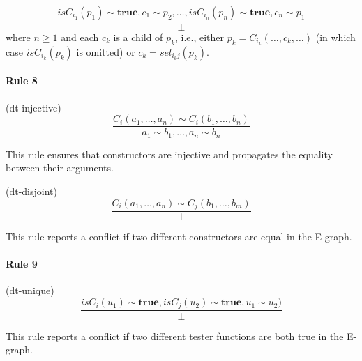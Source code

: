 \documentclass[a4paper]{article}
\newcommand\true{\mathbf{true}}
\newcommand\isC{\mathit{isC}}
\begin{document}
\[
\frac{\isC_{i_1}(p_1)\sim\true, c_1\sim p_2,\dots,\isC_{i_n}(p_n)\sim\true, c_n\sim p_1}{\bot}
\]
where $n\geq 1$ and each $c_k$ is a child of $p_k$, i.e., either
$p_k = C_{i_k}(\dots,c_k,\dots)$ (in which case $\isC_{i_k}(p_k)$ is omitted) or
$c_k = sel_{i_k j}(p_k)$.

\paragraph{Rule 8} (dt-injective)
\[
\frac{C_i(a_1,\dots,a_n) \sim C_i(b_1,\dots,b_n)}{a_1 \sim b_1,\dots, a_n\sim b_n}
\]

This rule ensures that constructors are injective and propagates the
equality between their arguments.


(dt-disjoint)
\[
\frac{C_i(a_1,\dots,a_n) \sim C_j(b_1,\dots,b_m)}{\bot}
\]

This rule reports a conflict if two different constructors are equal in
the E-graph.

\paragraph{Rule 9} (dt-unique)
\[
\frac{\isC_i(u_1) \sim \true, \isC_j(u_2)\sim \true, u_1\sim u_2)}{\bot}
\]

This rule reports a conflict if two different tester functions are both
true in the E-graph.
\end{document}
